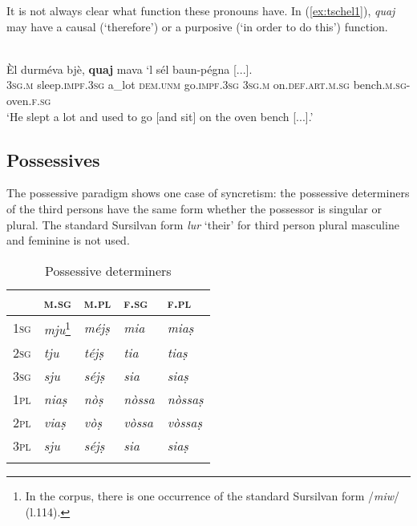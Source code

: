 It is not always clear what function these pronouns have. In (\ref{ex:tschel1}), \textit{quaj} may have a causal (`therefore') or a purposive (`in order to do this') function.

\ea
\label{ex:tschel1}
\\
\gll  Èl durméva bjè, \textbf{quaj} mava `l sél baun-pégna [...].\\
\textsc{3sg.m} sleep.\textsc{impf.3sg} a\_lot \textsc{dem.unm} go.\textsc{impf.3sg} \textsc{3sg.m} on.\textsc{def.art.m.sg} bench.\textsc{m.sg}-oven.\textsc{f.sg}\\
\glt `He slept a lot and used to go [and sit] on the oven bench [...].'
\z

\subsection{Possessives}
The possessive paradigm shows one case of syncretism: the possessive determiners of the third persons have the same form whether the possessor is singular or plural. The standard Sursilvan form \textit{lur} `their' for third person plural masculine and feminine is not used.

\begin{table}
	\caption{Possessive determiners}
	\label{possdet}
	\begin{tabular}{lllll}
		\lsptoprule
		& \textsc{m.sg} & \textsc{m.pl}  & \textsc{f.sg}  & \textsc{f.pl}\\
		\midrule
		\textsc{1sg}  & \textit{mju}\footnote{In the corpus, there is one occurrence of the standard Sursilvan form /\textit{miw}/ (l.114).}  & \textit{méjṣ} &  \textit{mia} & \textit{miaṣ}\\
		\textsc{2sg} & \textit{tju} & \textit{téjṣ} & \textit{tia} & \textit{tiaṣ}\\
		\textsc{3sg} & \textit{sju} & \textit{séjṣ} & \textit{sia} & \textit{siaṣ}\\
		\textsc{1pl} & \textit{niaṣ} & \textit{nòṣ} & \textit{nòssa} & \textit{nòssaṣ}\\
		\textsc{2pl} & \textit{viaṣ}  & \textit{vòṣ} & \textit{vòssa} & \textit{vòssaṣ}\\
		\textsc{3pl}	& \textit{sju} & \textit{séjṣ}  & \textit{sia} & \textit{siaṣ}\\
		\lspbottomrule
	\end{tabular}
\end{table}

\ea

